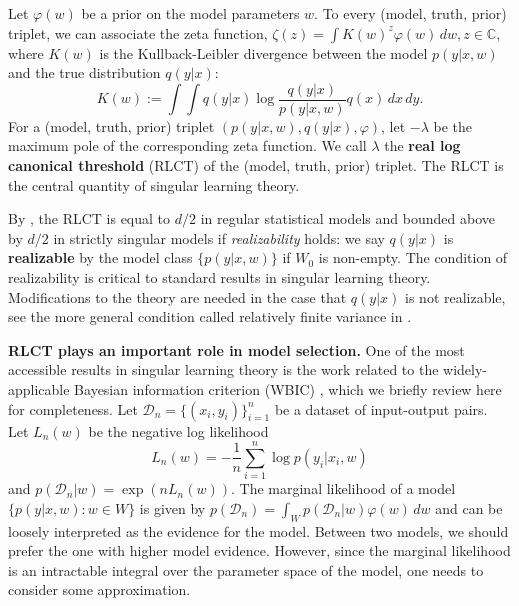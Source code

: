 \documentclass{article} %
\begin{document}
Let  $\varphi(w)$ be a prior on the model parameters $w$.
To every (model, truth, prior) triplet, we can associate the zeta function,
$
\zeta(z) = \int K(w)^z \varphi(w) \,dw, z \in \mathbb C,
$
where $K(w)$ is the Kullback-Leibler divergence between the model $p(y|x,w)$ and the true distribution $q(y|x)$:
\begin{equation}
    K(w) := \int \!\int q(y|x) \log \frac{ q(y|x) }{ p(y|x,w) } q(x) \,dx \,dy.
\label{eq:KL}
\end{equation}
For a (model, truth, prior) triplet $(p(y|x,w),q(y|x),\varphi)$, let $-\lambda$ be the maximum pole of the corresponding zeta function. We call $\lambda$ the \textbf{real log canonical threshold} (RLCT) \citep{watanabe_algebraic_2009} of the (model, truth, prior) triplet. The RLCT is the central quantity of singular learning theory. 

By {\citet[Theorem 6.4]{watanabe_algebraic_2009}}, the RLCT is equal to $d/2$ in regular statistical models and bounded above by $d/2$ in strictly singular models if \textit{realizability} holds:
we say $q(y|x)$ is \textbf{realizable} by the model class $\{p(y|x,w)\}$ if $W_0$ is non-empty.
The condition of realizability is critical to standard results in singular learning theory. Modifications to the theory are needed in the case that $q(y|x)$ is not realizable, see the more general condition called relatively finite variance in \citet{watanabe_mathematical_2018}.

\textbf{RLCT plays an important role in model selection.}
One of the most accessible results in singular learning theory is the work related to the widely-applicable Bayesian information criterion (WBIC) \citet{watanabe_widely_2013}, which we briefly review here for completeness.
Let $\mathcal D_n =  \{(x_i,y_i)\}_{i=1}^n$ be a dataset of input-output pairs.  
Let $L_n(w)$ be the negative log likelihood
\begin{equation}
L_n(w) = -\frac{1}{n} \sum_{i=1}^n \log p(y_i |x_i, w)
\label{eq:nll}
\end{equation}
and $p(\mathcal D_n | w) = \exp( n L_n(w)).$
The marginal likelihood of a model $\{p(y|x,w): w \in W\}$ is given by
$
p(\mathcal D_n) = \int_W p(\mathcal D_n|w) \varphi(w) \,dw
$
and can be loosely interpreted as the evidence for the model. Between two models, we should prefer the one with higher model evidence.
However, since the marginal likelihood is an intractable integral over the parameter space of the model, one needs to consider some approximation.
\end{document}
